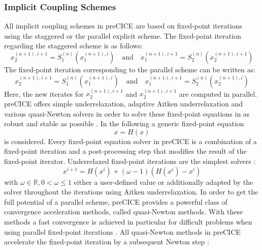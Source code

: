   \subsubsection{Implicit Coupling Schemes}\label{sec:Coupl-Coupling-Implicit}
   All implicit coupling schemes in preCICE are based on fixed-point iterations using the staggered or the parallel explicit scheme. The fixed-point iteration regarding the staggered scheme is as follows:
   \begin{equation}
   x_2^{(n+1),i+1} = S_1^{(n)}\left( x_1^{(n+1),i} \right)\quad \text{and}\quad x_1^{(n+1),i+1} = S_2^{(n)}\left( x_2^{(n+1),i+1} \right)
   \end{equation}
   The fixed-point iteration corresponding to the parallel scheme can be written as:
   \begin{equation}
   x_2^{(n+1),i+1} = S_1^{(n)}\left( x_1^{(n+1),i} \right)\quad \text{and}\quad x_1^{(n+1),i+1} = S_2^{(n)}\left( x_2^{(n+1),i} \right)
   \end{equation}
   Here, the new iterates for $x_2^{(n+1),i+1}$ and $x_2^{(n+1),i+1}$ are computed in parallel. preCICE offers simple underrelaxation, adaptive Aitken underrelaxation and various quasi-Newton solvers in order to solve these fixed-point equations in as robust and stable as possible \cite{bungartz2015fully}. In the following a generic fixed-point equation
   \begin{equation}\label{eq:fixed-point-eq}
   x = H(x)
   \end{equation}
   is considered. Every fixed-point equation solver in preCICE is a combination of a fixed-point iteration and a post-processing step that modifies the result of the fixed-point iterator. Underrelaxed fixed-point iterations are the simplest solvers \cite{bungartz2015fully}:
   \begin{equation}
   x^{i+1} = H(x^i)+(\omega - 1)\left( H(x^i) - x^i\right)
   \end{equation}
   with $\omega \in \mathbb{R}, 0 < \omega \leq 1$ either a user-defined value or additionally adapted by the solver throughout the iterations using Aitken underrelaxation.
   In order to get the full potential of a parallel scheme, preCICE provides a powerful class of convergence acceleration methods, called quasi-Newton methods. With these methods a fast convergence is achieved in particular for difficult problems when using parallel fixed-point iterations \cite{bungartz2015fully}. All quasi-Newton methods in preCICE accelerate the fixed-point iteration by a subsequent Newton step \cite{bungartz2015fully}:
